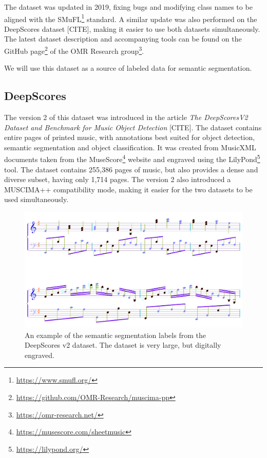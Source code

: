 The dataset was updated in 2019, fixing bugs and modifying class names to be aligned with the SMuFL\footnote{\url{https://www.smufl.org/}} standard. A similar update was also performed on the DeepScores dataset [CITE], making it easier to use both datasets simultaneously. The latest dataset description and accompanying tools can be found on the GitHub page\footnote{\url{https://github.com/OMR-Research/muscima-pp}} of the OMR Research group\footnote{\url{https://omr-research.net/}}.

We will use this dataset as a source of labeled data for semantic segmentation.


\subsection{DeepScores}

The version 2 of this dataset was introduced in the article \emph{The DeepScoresV2 Dataset and Benchmark for Music Object Detection} [CITE]. The dataset contains entire pages of printed music, with annotations best suited for object detection, semantic segmentation and object classification. It was created from MusicXML documents taken from the MuseScore\footnote{\url{https://musescore.com/sheetmusic}} website and engraved using the LilyPond\footnote{\url{https://lilypond.org/}} tool. The dataset contains 255,386 pages of music, but also provides a dense and diverse subset, having only 1,714 pages. The version 2 also introduced a MUSCIMA++ compatibility mode, making it easier for the two datasets to be used simultaneously.

\begin{figure}[ht]
    \centering
    \includegraphics[width=140mm]{../img/deepscores.png}
    \caption{An example of the semantic segmentation labels from the DeepScores v2 dataset. The dataset is very large, but digitally engraved.}
    \label{fig:DeepScoresV2}
\end{figure}

